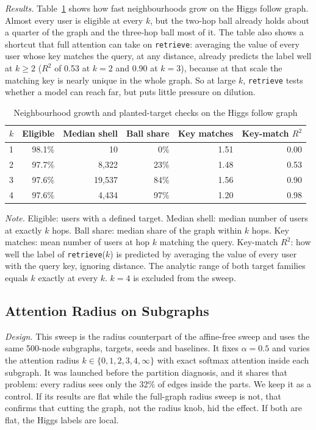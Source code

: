 \emph{Results.} Table~\ref{tab:shells} shows how fast neighbourhoods grow on the Higgs follow graph. Almost every user is eligible at every $k$, but the two-hop ball already holds about a quarter of the graph and the three-hop ball most of it. The table also shows a shortcut that full attention can take on \texttt{retrieve}: averaging the value of every user whose key matches the query, at any distance, already predicts the label well at $k\ge2$ ($R^2$ of 0.53 at $k=2$ and 0.90 at $k=3$), because at that scale the matching key is nearly unique in the whole graph. So at large $k$, \texttt{retrieve} tests whether a model can reach far, but puts little pressure on dilution.

\begin{table}[htbp]
\caption{Neighbourhood growth and planted-target checks on the Higgs follow graph}
\label{tab:shells}
\centering\small
\begin{tabular}{@{}lrrrrr@{}}
\toprule
$k$ & Eligible & Median shell & Ball share & Key matches & Key-match $R^2$ \\
\midrule
1 & 98.1\% & 10 & 0\% & 1.51 & 0.00 \\
2 & 97.7\% & 8,322 & 23\% & 1.48 & 0.53 \\
3 & 97.6\% & 19,537 & 84\% & 1.56 & 0.90 \\
4 & 97.6\% & 4,434 & 97\% & 1.20 & 0.98 \\
\bottomrule
\end{tabular}

\vspace{4pt}
\parbox{0.92\textwidth}{\footnotesize\textit{Note.} Eligible: users with a defined target. Median shell: median number of users at exactly $k$ hops. Ball share: median share of the graph within $k$ hops. Key matches: mean number of users at hop $k$ matching the query. Key-match $R^2$: how well the label of \texttt{retrieve}($k$) is predicted by averaging the value of every user with the query key, ignoring distance. The analytic range of both target families equals $k$ exactly at every $k$. $k=4$ is excluded from the sweep.}
\end{table}  

\subsection{Attention Radius on Subgraphs}
\emph{Design.} This sweep is the radius counterpart of the affine-free sweep and uses the same 500-node subgraphs, targets, seeds and baselines. It fixes $\alpha=0.5$ and varies the attention radius $k\in\{0,1,2,3,4,\infty\}$ with exact softmax attention inside each subgraph. It was launched before the partition diagnosis, and it shares that problem: every radius sees only the 32\% of edges inside the parts. We keep it as a control. If its results are flat while the full-graph radius sweep is not, that confirms that cutting the graph, not the radius knob, hid the effect. If both are flat, the Higgs labels are local.

